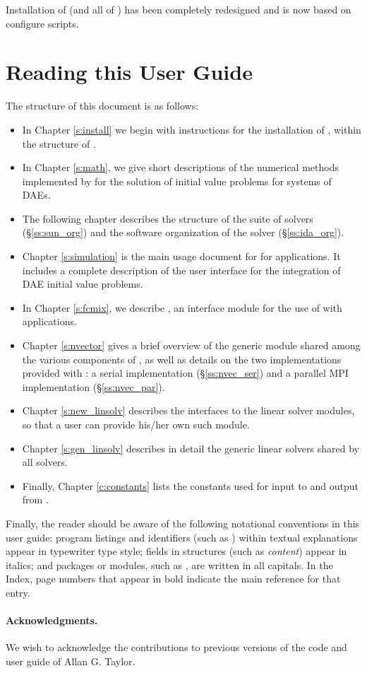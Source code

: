 Installation of {\ida} (and all of {\sundials}) has been completely 
redesigned and is now based on configure scripts.


\section{Reading this User Guide}\label{ss:reading}

The structure of this document is as follows:
\begin{itemize}
\item
  In Chapter \ref{s:install} we begin with instructions for the installation of 
  {\ida}, within the structure of {\sundials}.
\item
  In Chapter \ref{s:math}, we give short descriptions of the numerical 
  methods implemented by {\ida} for the solution of initial value problems
  for systems of DAEs.
\item
  The following chapter describes the structure of the {\sundials} suite
  of solvers (\S\ref{ss:sun_org}) and the software organization of the {\ida}
  solver (\S\ref{ss:ida_org}). 
\item
  Chapter \ref{s:simulation} is the main usage document for {\ida} for
  {\C} applications.  It includes a complete description of the user interface
  for the integration of DAE initial value problems.
\item
  In Chapter \ref{s:fcmix}, we describe {\fida}, an interface module
  for the use of {\ida} with {\F} applications.
\item
  Chapter \ref{s:nvector} gives a brief overview of the generic {\nvector} module 
  shared among the various components of {\sundials}, as well as details on the two
  {\nvector} implementations provided with {\sundials}: a serial implementation
  (\S\ref{ss:nvec_ser}) and a parallel MPI implementation (\S\ref{ss:nvec_par}).
\item
  Chapter \ref{s:new_linsolv} describes the interfaces to the linear solver
  modules, so that a user can provide his/her own such module.
\item
  Chapter \ref{s:gen_linsolv} describes in detail the generic linear solvers shared 
  by all {\sundials} solvers.
\item
  Finally, Chapter \ref{c:constants} lists the constants used for input to
  and output from {\ida}.
\end{itemize}

Finally, the reader should be aware of the following notational conventions
in this user guide:  program listings and identifiers (such as ) 
within textual explanations appear in typewriter type style; 
fields in {\C} structures (such as {\em content}) appear in italics;
and packages or modules, such as {\idadense}, are written in all capitals. 
In the Index, page numbers that appear in bold indicate the main reference
for that entry.

\paragraph{Acknowledgments.}
We wish to acknowledge the contributions to previous versions of the
{\ida} code and user guide of Allan G. Taylor.

